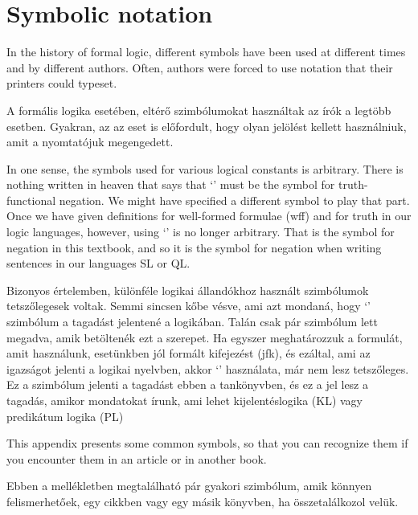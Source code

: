 \chapter[Other symbolic notation]{Symbolic notation}
\label{app.notation}


In the history of formal logic, different symbols have been used at different times and by different authors. Often, authors were forced to use notation that their printers could typeset.

A formális logika esetében, eltérő szimbólumokat használtak az írók a legtöbb esetben. Gyakran, az az eset is előfordult, hogy olyan jelölést kellett használniuk, amit a nyomtatójuk megengedett. 

In one sense, the symbols used for various logical constants is arbitrary. There is nothing written in heaven that says that `\enot' must be the symbol for truth-functional negation. We might have specified a different symbol to play that part. Once we have given definitions for well-formed formulae (wff) and for truth in our logic languages, however, using `\enot' is no longer arbitrary. That is the symbol for negation in this textbook, and so it is the symbol for negation when writing sentences in our languages SL or QL.

Bizonyos értelemben, különféle logikai állandókhoz használt szimbólumok tetszőlegesek voltak. Semmi sincsen kőbe vésve, ami azt mondaná, hogy `\enot' szimbólum a tagadást jelentené a logikában. Talán csak pár szimbólum lett megadva, amik betöltenék ezt a szerepet. Ha egyszer meghatározzuk a formulát, amit használunk, esetünkben jól formált kifejezést (jfk), és ezáltal, ami az igazságot jelenti a logikai nyelvben, akkor `\enot' használata, már nem lesz tetszőleges. Ez a szimbólum jelenti a tagadást ebben a tankönyvben, és ez a jel lesz a tagadás, amikor mondatokat írunk, ami lehet kijelentéslogika (KL) vagy predikátum logika (PL)

This appendix presents some common symbols, so that you can recognize them if you encounter them in an article or in another book.

Ebben a mellékletben megtalálható pár gyakori szimbólum, amik könnyen felismerhetőek, egy cikkben vagy egy másik könyvben, ha összetalálkozol velük.


